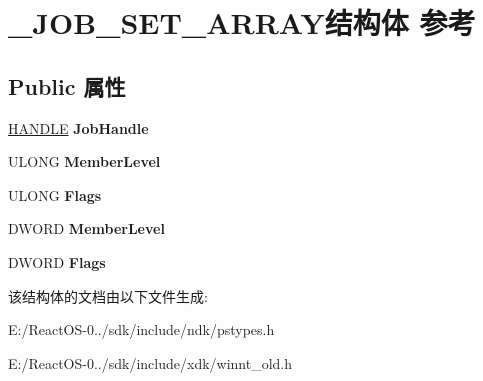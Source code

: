 \hypertarget{struct___j_o_b___s_e_t___a_r_r_a_y}{}\section{\+\_\+\+J\+O\+B\+\_\+\+S\+E\+T\+\_\+\+A\+R\+R\+A\+Y结构体 参考}
\label{struct___j_o_b___s_e_t___a_r_r_a_y}
\subsection*{Public 属性}
\begin{DoxyCompactItemize}
\item 
\mbox{\label{struct___j_o_b___s_e_t___a_r_r_a_y_aaf079b298d1df7651c1a2b0946203baf}} 
\hyperlink{interfacevoid}{H\+A\+N\+D\+LE} {\bfseries Job\+Handle}
\item 
\mbox{\label{struct___j_o_b___s_e_t___a_r_r_a_y_a4d03334e4a967b902383d312dbf67a08}} 
U\+L\+O\+NG {\bfseries Member\+Level}
\item 
\mbox{\label{struct___j_o_b___s_e_t___a_r_r_a_y_a42af3566358c7ed282c832bf186fe6dd}} 
U\+L\+O\+NG {\bfseries Flags}
\item 
\mbox{\label{struct___j_o_b___s_e_t___a_r_r_a_y_a435f3b344e4418b4483dedc71190e89d}} 
D\+W\+O\+RD {\bfseries Member\+Level}
\item 
\mbox{\label{struct___j_o_b___s_e_t___a_r_r_a_y_ad1cca0cdd22e82b904f0fbe384047205}} 
D\+W\+O\+RD {\bfseries Flags}
\end{DoxyCompactItemize}


该结构体的文档由以下文件生成\+:\begin{DoxyCompactItemize}
\item 
E\+:/\+React\+O\+S-\/0../sdk/include/ndk/pstypes.\+h\item 
E\+:/\+React\+O\+S-\/0../sdk/include/xdk/winnt\+\_\+old.\+h\end{DoxyCompactItemize}
